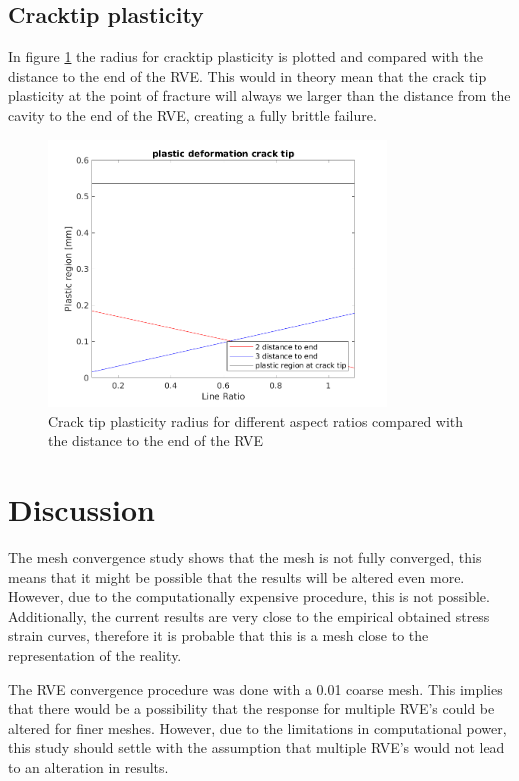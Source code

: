 \subsection{Cracktip plasticity}

In figure \ref{fig:cracktip} the radius for cracktip plasticity is plotted and compared with the distance to the end of the RVE. This would in theory mean that the crack tip plasticity at the point of fracture will always we larger than the distance from the cavity to the end of the RVE, creating a fully brittle failure.  
\begin{figure}[H]
    \centering
    \includegraphics[width=0.80\textwidth]{chapter_7_non-elasticmodelling/figures/cracktip.png}
    \caption{Crack tip plasticity radius for different aspect ratios compared with the distance to the end of the RVE}
    \label{fig:cracktip}
\end{figure}


\section{Discussion}
The mesh convergence study shows that the mesh is not fully converged, this means that it might be possible that the results will be altered even more. However, due to the computationally expensive procedure, this is not possible. Additionally, the current results are very close to the empirical obtained stress strain curves, therefore it is probable that this is a mesh close to the representation of the reality. 

The RVE convergence procedure was done with a 0.01 coarse mesh. This implies that there would be a possibility that the response for multiple RVE's could be altered for finer meshes. However, due to the limitations in computational power, this study should settle with the assumption that multiple RVE's would not lead to an alteration in results.  

